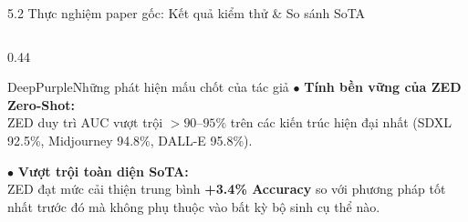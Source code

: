 \documentclass[aspectratio=169, 10pt, t]{beamer}
\begin{document}
\begin{frame}{5.2 Thực nghiệm paper gốc: Kết quả kiểm thử \& So sánh SoTA}
\begin{columns}[c, totalwidth=\linewidth]
\begin{column}{0.44\linewidth}
\begin{accentbox}[top=1.0mm, bottom=1.0mm]{DeepPurple}{Những phát hiện mấu chốt của tác giả}
        $\bullet$ \textbf{Tính bền vững của ZED Zero-Shot:}\\
        ZED duy trì AUC vượt trội $>90\text{--}95\%$ trên các kiến trúc hiện đại nhất (SDXL 92.5\%, Midjourney 94.8\%, DALL-E 95.8\%).
        \vspace{0.18em}

        $\bullet$ \textbf{Vượt trội toàn diện SoTA:}\\
        ZED đạt mức cải thiện trung bình \textbf{+3.4\% Accuracy} so với phương pháp tốt nhất trước đó mà không phụ thuộc vào bất kỳ bộ sinh cụ thể nào.
      \end{accentbox}
    \end{column}
  \end{columns}
\end{frame}

\end{document}
